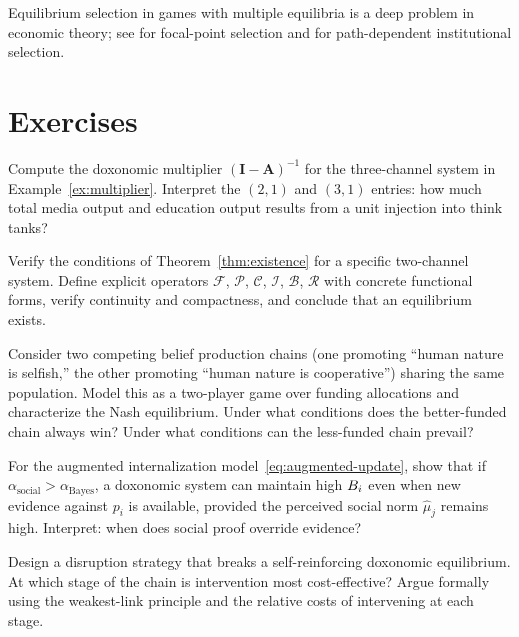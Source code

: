 Equilibrium selection in games with multiple equilibria is a deep problem in economic theory; see \textcite{schelling1978} for focal-point selection and \textcite{north1990} for path-dependent institutional selection.


\section{Exercises}

\begin{exercise}
Compute the doxonomic multiplier $(\bm{I} - \bm{A})^{-1}$ for the three-channel system in Example~\ref{ex:multiplier}.
Interpret the $(2,1)$ and $(3,1)$ entries: how much total media output and education output results from a unit injection into think tanks?
\end{exercise}

\begin{exercise}
\label{ex:ch5-existence}
Verify the conditions of Theorem~\ref{thm:existence} for a specific two-channel system.
Define explicit operators $\mathcal{F}$, $\mathcal{P}$, $\mathcal{C}$, $\mathcal{I}$, $\mathcal{B}$, $\mathcal{R}$ with concrete functional forms, verify continuity and compactness, and conclude that an equilibrium exists.
\end{exercise}

\begin{exercise}
Consider two competing belief production chains (one promoting ``human nature is selfish,'' the other promoting ``human nature is cooperative'') sharing the same population.
Model this as a two-player game over funding allocations and characterize the Nash equilibrium.
Under what conditions does the better-funded chain always win?
Under what conditions can the less-funded chain prevail?
\end{exercise}

\begin{exercise}
For the augmented internalization model~\eqref{eq:augmented-update}, show that if $\alpha_{\text{social}} > \alpha_{\text{Bayes}}$, a doxonomic system can maintain high $B_{i}$ even when new evidence against $p_i$ is available, provided the perceived social norm $\hat{\mu}_j$ remains high.
Interpret: when does social proof override evidence?
\end{exercise}

\begin{exercise}
Design a disruption strategy that breaks a self-reinforcing doxonomic equilibrium.
At which stage of the chain is intervention most cost-effective?
Argue formally using the weakest-link principle and the relative costs of intervening at each stage.
\end{exercise}

